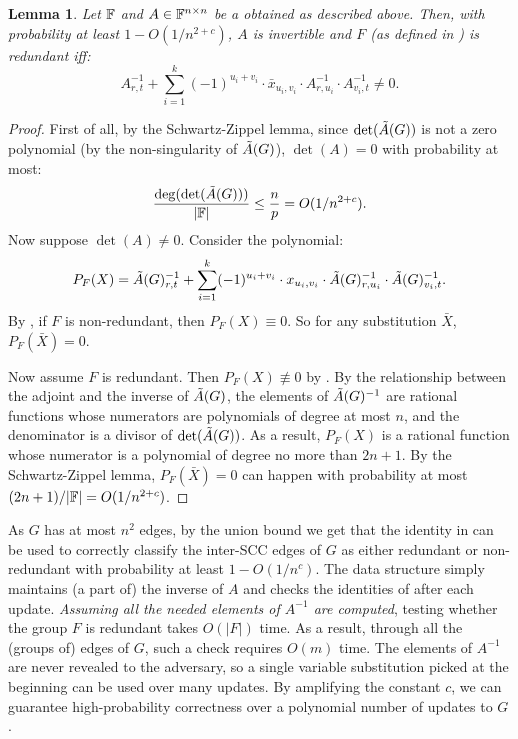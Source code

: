 \documentclass[11pt]{article}
\newtheorem{lemma}[theorem]{Lemma}
\begin{document}
{\begin{lemma}\label{l:random-substitution}
Let $\mathbb{F}$ and
$A\in \mathbb{F}^{n\times n}$ be a obtained as described above.
Then, with probability at least $1-O(1/n^{2+c})$, $A$ is invertible and $F$ (as defined in ) is redundant iff:
\begin{equation*}
A^{-1}_{r,t}+\sum_{i=1}^k (-1)^{u_i+v_i}\cdot \bar{x}_{u_i,v_i}\cdot A^{-1}_{r,u_i}\cdot A^{-1}_{v_i,t}\neq 0.
\end{equation*}
\end{lemma}
\begin{proof}
First of all, by the Schwartz-Zippel lemma, since $\det(\tilde{A}(G))$ is not a zero polynomial (by the non-singularity of $\tilde{A}(G)$), $\det(A)= 0$
with probability at most:
\begin{equation*}
\frac{\deg(\det(\tilde{A}(G)))}{|\mathbb{F}|}\leq \frac{n}{p}=O(1/n^{2+c}).
\end{equation*}
Now suppose $\det(A)\neq 0$. Consider the polynomial:
\begin{equation*}
P_F(X)=\tilde{A}(G)^{-1}_{r,t}+\sum_{i=1}^k (-1)^{u_i+v_i}\cdot x_{u_i,v_i}\cdot \tilde{A}(G)^{-1}_{r,u_i}\cdot \tilde{A}(G)^{-1}_{v_i,t}.
\end{equation*}
By , if $F$ is non-redundant, then $P_F(X)\equiv 0$. So for any substitution $\bar{X}$, $P_F(\bar{X})=0$. 

Now assume $F$ is redundant.
Then $P_F(X)\not\equiv 0$ by . By the relationship between the adjoint and the inverse of $\tilde{A}(G)$,
the elements of $\tilde{A}(G)^{-1}$
are rational functions whose numerators are polynomials of degree at most $n$, and the denominator is a divisor of $\det(\tilde{A}(G))$.
As a result, $P_F(X)$ is a rational function 
whose numerator is a polynomial of degree no more than $2n+1$.
By the Schwartz-Zippel lemma, $P_F(\bar{X})=0$ can happen
with probability at most $(2n+1)/|\mathbb{F}|=O(1/n^{2+c})$.
\end{proof}
As $G$ has at most $n^2$ edges, by the union bound we get that the identity in  can be used to correctly classify the inter-SCC edges of $G$ as either redundant or non-redundant with probability at least $1-O(1/n^c)$.
The data structure simply maintains (a part of) the inverse of $A$ and checks the identities
of  after each update.
\emph{Assuming all the needed elements
of $A^{-1}$ are computed}, testing whether the group $F$ is redundant
takes $O(|F|)$ time. As a result, through all the (groups of) edges of $G$, such a check requires $O(m)$ time.
The elements of $A^{-1}$ are never revealed to the adversary, so a single variable substitution picked at the beginning can be used over many updates. By amplifying the constant $c$, we can guarantee high-probability correctness over a polynomial number of updates to $G$.

}
\end{document}
